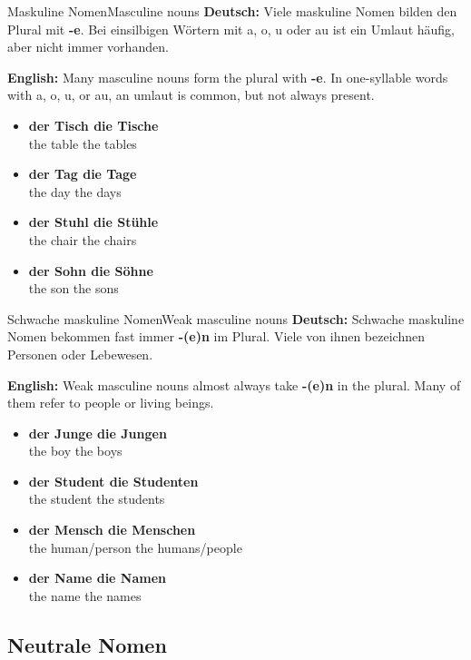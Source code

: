 \documentclass[a4paper,11pt]{article}
\newcommand{\GermanText}[1]{\textbf{Deutsch: }#1\par}
\newcommand{\EnglishText}[1]{{\small\color{SoftGray}\textbf{English: }#1\par}}
\newcommand{\ExampleItem}[2]{\item \textbf{#1}\\{\small\color{SoftGray}#2}}
\begin{document}
\begin{grammarentry}{Maskuline Nomen}{Masculine nouns}
\GermanText{Viele maskuline Nomen bilden den Plural mit \textbf{-e}. Bei einsilbigen Wörtern mit a, o, u oder au ist ein Umlaut häufig, aber nicht immer vorhanden.}
\EnglishText{Many masculine nouns form the plural with \textbf{-e}. In one-syllable words with a, o, u, or au, an umlaut is common, but not always present.}
\begin{exbox}
\begin{itemize}
\ExampleItem{der Tisch \textrightarrow{} die Tische}{the table \textrightarrow{} the tables}
\ExampleItem{der Tag \textrightarrow{} die Tage}{the day \textrightarrow{} the days}
\ExampleItem{der Stuhl \textrightarrow{} die Stühle}{the chair \textrightarrow{} the chairs}
\ExampleItem{der Sohn \textrightarrow{} die Söhne}{the son \textrightarrow{} the sons}
\end{itemize}
\end{exbox}
\end{grammarentry}

\begin{grammarentry}{Schwache maskuline Nomen}{Weak masculine nouns}
\GermanText{Schwache maskuline Nomen bekommen fast immer \textbf{-(e)n} im Plural. Viele von ihnen bezeichnen Personen oder Lebewesen.}
\EnglishText{Weak masculine nouns almost always take \textbf{-(e)n} in the plural. Many of them refer to people or living beings.}
\begin{exbox}
\begin{itemize}
\ExampleItem{der Junge \textrightarrow{} die Jungen}{the boy \textrightarrow{} the boys}
\ExampleItem{der Student \textrightarrow{} die Studenten}{the student \textrightarrow{} the students}
\ExampleItem{der Mensch \textrightarrow{} die Menschen}{the human/person \textrightarrow{} the humans/people}
\ExampleItem{der Name \textrightarrow{} die Namen}{the name \textrightarrow{} the names}
\end{itemize}
\end{exbox}
\end{grammarentry}

\subsection{Neutrale Nomen}
\end{document}
